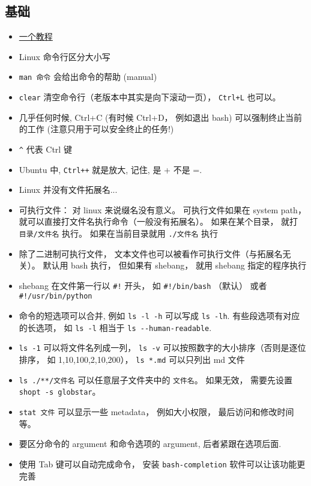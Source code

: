 

\subsection{基础}
\begin{itemize}
\item \href{http://faculty.salina.k-state.edu/tim/unix_sg/index.html}{一个教程}
\item Linux 命令行区分大小写
\item \verb`man 命令`  会给出命令的帮助 (manual)
\item \verb`clear` 清空命令行（老版本中其实是向下滚动一页）， \verb|Ctrl+L| 也可以。
\item 几乎任何时候, Ctrl+C (有时候 Ctrl+D， 例如退出 bash) 可以强制终止当前的工作 (注意只用于可以安全终止的任务!)
\item \verb`^` 代表 Ctrl 键
\item Ubuntu 中, \verb|Ctrl++| 就是放大, 记住, 是 + 不是 =.
\item Linux 并没有文件拓展名...
\item 可执行文件： 对 linux 来说缀名没有意义。 可执行文件如果在 system path， 就可以直接打文件名执行命令（一般没有拓展名）。 如果在某个目录， 就打 \verb`目录/文件名` 执行。 如果在当前目录就用 \verb`./文件名` 执行
\item 除了二进制可执行文件， 文本文件也可以被看作可执行文件（与拓展名无关）。 默认用 bash 执行， 但如果有 shebang， 就用 shebang 指定的程序执行
\item shebang 在文件第一行以 \verb`#!` 开头， 如 \verb`#!/bin/bash` （默认） 或者 \verb`#!/usr/bin/python`
\item 命令的短选项可以合并, 例如 \verb`ls -l -h` 可以写成 \verb`ls -lh`. 有些段选项有对应的长选项， 如 \verb`ls -l` 相当于 \verb`ls --human-readable`.
\item \verb`ls -1` 可以将文件名列成一列， \verb`ls -v` 可以按照数字的大小排序（否则是逐位排序， 如 1,10,100,2,10,200）， \verb`ls *.md` 可以只列出 md 文件
\item \verb|ls ./**/文件名| 可以任意层子文件夹中的 \verb|文件名|。 如果无效， 需要先设置 \verb|shopt -s globstar|。
\item \verb|stat 文件| 可以显示一些 metadata， 例如大小权限， 最后访问和修改时间等。
\item 要区分命令的 argument 和命令选项的 argument, 后者紧跟在选项后面.
\item 使用 Tab 键可以自动完成命令， 安装 \verb|bash-completion| 软件可以让该功能更完善

\end{itemize}
